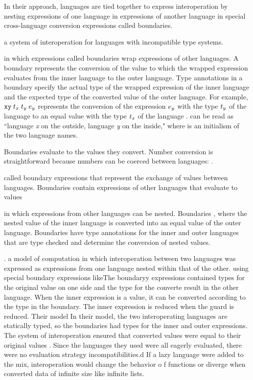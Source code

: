 In their approach, languages are tied together to express interoperation by nesting expressions of one language in expressions of another language in special cross-language conversion expressions called boundaries.

 a system of interoperation for languages with incompatible type systems.

 in which expressions called boundaries wrap expressions of other languages. A boundary represents the conversion of the value to which the wrapped expression evaluates from the inner language to the outer language. Type annotations in a boundary specify the actual type of the wrapped expression of the inner language and the expected type of the converted value of the outer language. For example, $\mathtt{xy}\;t_x\;t_y\;e_y$ represents the conversion of the expression $e_y$ with the type $t_y$ of the language  to an equal value with the type $t_x$ of the language .  can be read as ``language \emph{x} on the outside, language \emph{y} on the inside," where  is an initialism of the two language names.

Boundaries evaluate to the values they convert. Number conversion is straightforward because numbers can be coerced between languages: .


 called boundary expressions that represent the exchange of values between languages. Boundaries contain expressions of other languages that evaluate to values 

 in which expressions from other languages can be nested. Boundaries , where the nested value of the inner language is converted into an equal value of the outer language. Boundaries have type annotations for the inner and outer languages that are type checked and determine the conversion of nested values.



. a model of computation in which interoperation between two languages was expressed as expressions from one language nested within that of the other. using special boundary expressions likeThe boundaryy expressions contained types for the original value on one side and the type for the converte result  in the other language. When the inner expression is a value, it can be converted according to the type in the boundary. The inner expression is reduced when the guard is reduced.  Their model In their model, the two interoperating languages are statically typed, so the boundaries had types for the inner and outer expressions. The system of interoperation ensured that converted values were equal to their original values . Since the languages they used were all eagerly evaluated, there were no evaluation strategy incompatibilities.d If a lazy language were added to the mix, interoperation would change the behavior o f functions or diverge when converted data of infinite size like infinite lists. 

